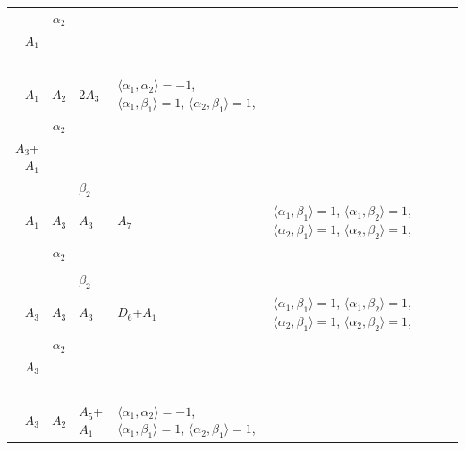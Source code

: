 \documentclass[12pt]{report}
\begin{document}
\begin{appendix}
{\begin{longtable}{rcl p{1cm}p{1cm}p{3cm} }
\\
\begin{tabular}{cc}$\alpha_1$+ & $\alpha_2$\\\tiny{ $A_1$ } & \tiny{  }\end{tabular} &\begin{tabular}{c} = \\~ \end{tabular} & \begin{tabular}{c}$\beta_1$\\\tiny{ $A_1$ }\end{tabular} & $A_2$ & 2$A_3$ & $\langle\alpha_1, \alpha_2\rangle=-1$,  $\langle\alpha_1, \beta_1\rangle=1$, $\langle\alpha_2, \beta_1\rangle=1$, 
\\
\begin{tabular}{cc}$\alpha_1$+ & $\alpha_2$\\\tiny{ $A_3$+$A_1$ } & \tiny{  }\end{tabular} &\begin{tabular}{c} = \\~ \end{tabular} & \begin{tabular}{cc}$\beta_1$+ & $\beta_2$\\\tiny{ $A_1$ } & \tiny{ $A_3$ }\end{tabular} & $A_3$ & $A_7$ &  $\langle\alpha_1, \beta_1\rangle=1$, $\langle\alpha_1, \beta_2\rangle=1$, $\langle\alpha_2, \beta_1\rangle=1$, $\langle\alpha_2, \beta_2\rangle=1$, 
\\
\begin{tabular}{cc}$\alpha_1$+ & $\alpha_2$\\\tiny{  } & \tiny{  }\end{tabular} &\begin{tabular}{c} = \\~ \end{tabular} & \begin{tabular}{cc}$\beta_1$+ & $\beta_2$\\\tiny{ $A_3$ } & \tiny{ $A_3$ }\end{tabular} & $A_3$ & $D_6$+$A_1$ &  $\langle\alpha_1, \beta_1\rangle=1$, $\langle\alpha_1, \beta_2\rangle=1$, $\langle\alpha_2, \beta_1\rangle=1$, $\langle\alpha_2, \beta_2\rangle=1$, 
\\
\begin{tabular}{cc}$\alpha_1$+ & $\alpha_2$\\\tiny{ $A_3$ } & \tiny{  }\end{tabular} &\begin{tabular}{c} = \\~ \end{tabular} & \begin{tabular}{c}$\beta_1$\\\tiny{ $A_3$ }\end{tabular} & $A_2$ & $A_5$+$A_1$ & $\langle\alpha_1, \alpha_2\rangle=-1$,  $\langle\alpha_1, \beta_1\rangle=1$, $\langle\alpha_2, \beta_1\rangle=1$, 

\end{longtable}}
\end{appendix}
\end{document}
